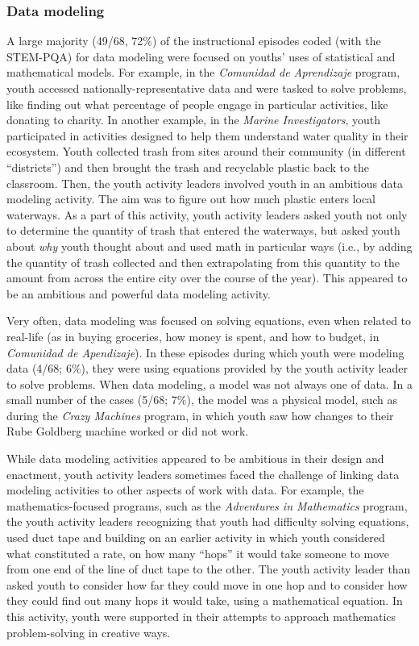 \documentclass[]{msu-thesis}
\theoremstyle{definition}
\theoremstyle{definition}
\theoremstyle{definition}
\theoremstyle{remark}
\begin{document}
\subsubsection{Data modeling}\label{data-modeling}

A large majority (49/68, 72\%) of the instructional episodes coded (with
the STEM-PQA) for data modeling were focused on youths' uses of
statistical and mathematical models. For example, in the \emph{Comunidad
de Aprendizaje} program, youth accessed nationally-representative data
and were tasked to solve problems, like finding out what percentage of
people engage in particular activities, like donating to charity. In
another example, in the \emph{Marine Investigators}, youth participated
in activities designed to help them understand water quality in their
ecosystem. Youth collected trash from sites around their community (in
different ``districts'') and then brought the trash and recyclable
plastic back to the classroom. Then, the youth activity leaders involved
youth in an ambitious data modeling activity. The aim was to figure out
how much plastic enters local waterways. As a part of this activity,
youth activity leaders asked youth not only to determine the quantity of
trash that entered the waterways, but asked youth about \emph{why} youth
thought about and used math in particular ways (i.e., by adding the
quantity of trash collected and then extrapolating from this quantity to
the amount from across the entire city over the course of the year).
This appeared to be an ambitious and powerful data modeling activity.

Very often, data modeling was focused on solving equations, even when
related to real-life (as in buying groceries, how money is spent, and
how to budget, in \emph{Comunidad de Apendizaje}). In these episodes
during which youth were modeling data (4/68; 6\%), they were using
equations provided by the youth activity leader to solve problems. When
data modeling, a model was not always one of data. In a small number of
the cases (5/68; 7\%), the model was a physical model, such as during
the \emph{Crazy Machines} program, in which youth saw how changes to
their Rube Goldberg machine worked or did not work.

While data modeling activities appeared to be ambitious in their design
and enactment, youth activity leaders sometimes faced the challenge of
linking data modeling activities to other aspects of work with data. For
example, the mathematics-focused programs, such as the \emph{Adventures
in Mathematics} program, the youth activity leaders recognizing that
youth had difficulty solving equations, used duct tape and building on
an earlier activity in which youth considered what constituted a rate,
on how many ``hops'' it would take someone to move from one end of the
line of duct tape to the other. The youth activity leader than asked
youth to consider how far they could move in one hop and to consider how
they could find out many hops it would take, using a mathematical
equation. In this activity, youth were supported in their attempts to
approach mathematics problem-solving in creative ways.
\end{document}
